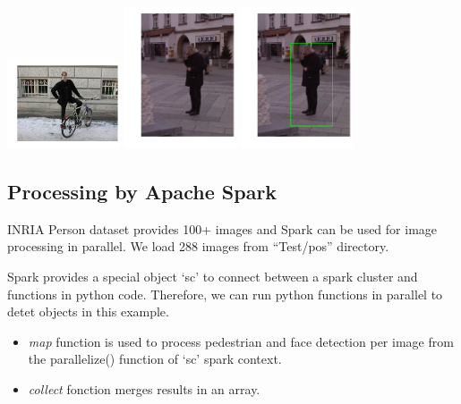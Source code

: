 \includegraphics[width=0.25\textwidth]{facedetection_files/facedetection_62_7.png}
\includegraphics[width=0.25\textwidth]{facedetection_files/facedetection_62_8.png}
\includegraphics[width=0.25\textwidth]{facedetection_files/facedetection_62_9.png}

\subsection{Processing by Apache
Spark}\label{processing-by-apache-spark}

INRIA Person dataset provides 100+ images and Spark can be used for
image processing in parallel. We load 288 images from ``Test/pos''
directory.

Spark provides a special object `sc' to connect between a spark cluster
and functions in python code. Therefore, we can run python functions in
parallel to detet objects in this example.

\begin{itemize}

\item
  \emph{map} function is used to process pedestrian and face detection
  per image from the parallelize() function of `sc' spark context.
\item
  \emph{collect} fonction merges results in an array.
\end{itemize}

